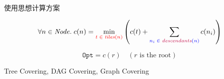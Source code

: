\begin{frame}{}
	\begin{center}
		使用思想计算方案
	\end{center}


	\pause
	\[
		\forall n \in \mathit{Node}.\;
		  c(n) = \min_{\textcolor{red}{t \;\in\; \mathit{tiles}(n)}}
			  \left(c(t) + \sum_{\textcolor{blue}{n_{i} \;\in\; \mathit{\textcolor{purple}{descendants}(n)}}} c(n_{i})\right)
	\]

	\pause
	\[
		\texttt{Opt} = c(r) \quad (r \text{ is the root})
	\]
\end{frame}

\begin{frame}{}
	\pause
	\pause
\end{frame}

\begin{frame}{}
	\begin{center}
		Tree Covering, DAG Covering, Graph Covering
	\end{center}
\end{frame}
